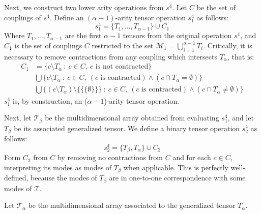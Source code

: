 \documentclass{article}
\theoremstyle{plain}
\theoremstyle{definition}
\theoremstyle{remark}
\newcommand{\cM}{\mathcal{M}}
\newcommand{\cT}{\mathcal{T}}
\begin{document}
Next, we construct two lower arity operations from $s^4$. Let $C$ be the set of couplings of $s^4$. Define an $(\alpha - 1)$-arity tensor operation $s^4_1$ as follows:
\begin{equation*}
	s^4_1 = \{T_1, ..., T_{\alpha - 1}\} \cup C_1
\end{equation*}
Where $T_1, ..., T_{\alpha -1}$ are the first $\alpha - 1$ tensors from the original operation $s^4$, and $C_1$ is the set of couplings $C$ restricted to the set $\cM_1 = \bigcup_{i = 1}^{\alpha -1} T_i$. Critically, it is necessary to remove contractions from any coupling which intersects $T_{\alpha}$, that is:
\begin{equation*}
	\begin{aligned}
		C_1 &= \big\{ c \setminus T_{\alpha} \ : \ c \in C, \ c \text{ is not contracted} \big\} \\
		&\bigcup \big\{ c \setminus T_{\alpha} \ : \ c \in C, \ (c \text{ is contracted}) \wedge (c \cap T_{\alpha} = \emptyset) \big\}\\
		&\bigcup \big\{ (c \setminus T_{\alpha}) \setminus \{ \{ \{ \emptyset \} \} \} \ : \ c \in C, \ (c \text{ is contracted}) \wedge (c \cap T_{\alpha} \neq \emptyset) \big\}
	\end{aligned}
\end{equation*}
$s^4_1$ is, by construction, an ($\alpha - 1$)-arity tensor operation.

Next, let $\cT_{\beta}$ be the multidimensional array obtained from evaluating $s^4_1$, and let $T_{\beta}$ be its associated generalized tensor. We define a binary tensor operation $s^4_2$ as follows:
\begin{equation*}
	s^4_2 = \{T_{\beta}, T_{\alpha}\} \cup C_2
\end{equation*}
Form $C_2$ from $C$ by removing no contractions from $C$ and for each $c \in C$, interpreting its modes as modes of $T_{\beta}$ when applicable. This is perfectly well-defined, because the modes of $T_{\beta}$ are in one-to-one correspondence with some modes of $\cT$.

Let $\cT_{\alpha}$ be the multidimensional array associated to the generalized tensor $T_{\alpha}$. 
\end{document}
